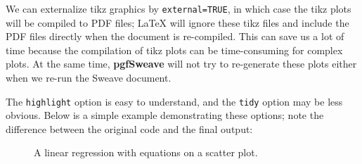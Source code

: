 \documentclass[english,noae,nogin]{article}
\begin{document}
We can externalize tikz graphics by \texttt{external=TRUE}, in which
case the tikz plots will be compiled to PDF files; \LaTeX{} will ignore
these tikz files and include the PDF files directly when the document
is re-compiled. This can save us a lot of time because the compilation
of tikz plots can be time-consuming for complex plots. At the same
time, \textbf{pgfSweave} will not try to re-generate these plots either
when we re-run the Sweave document.

The \texttt{highlight} option is easy to understand, and the \texttt{tidy}
option may be less obvious. Below is a simple example demonstrating
these options; note the difference between the original code and the
final output:

\begin{center}
\begin{figure}

{\tikzexternaldisable

}

%
\caption{A linear regression with equations on a scatter plot.\label{fig:lm-demo}}
\end{figure}

\par\end{center}
\end{document}
